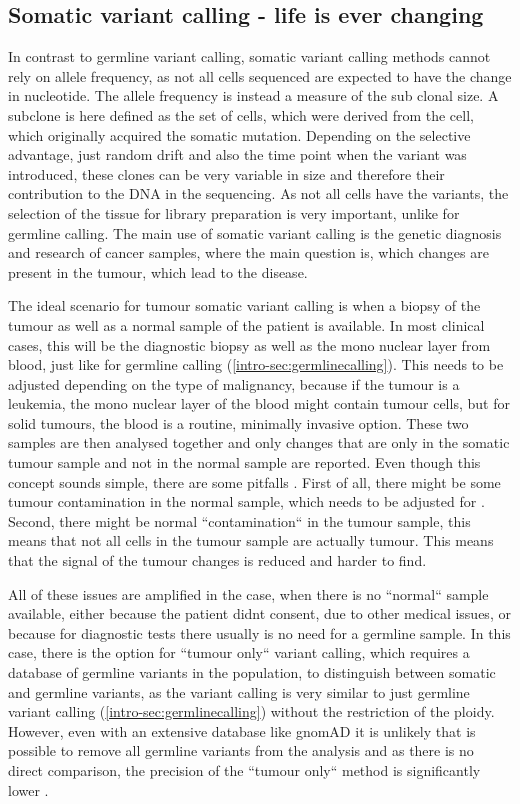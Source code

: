 \subsection[Somatic]{Somatic variant calling - life is ever changing}
\label{intro-sec:somaticcalling}
In contrast to germline variant calling, somatic variant calling methods cannot rely on allele frequency, as not all cells sequenced are expected to have the change in nucleotide. The allele frequency is instead a measure of the sub clonal size. A subclone is here defined as the set of cells, which were derived from the cell, which originally acquired the somatic mutation. Depending on the selective advantage, just random drift and also the time point when the variant was introduced, these clones can be very variable in size and therefore their contribution to the DNA in the sequencing.
As not all cells have the variants, the selection of the tissue for library preparation is very important, unlike for germline calling. 
The main use of somatic variant calling is the genetic diagnosis and research of cancer samples, where the main question is, which changes are present in the tumour, which lead to the disease.

The ideal scenario for tumour somatic variant calling is when a biopsy of the tumour as well as a normal sample of the patient is available. In most clinical cases, this will be the diagnostic biopsy as well as the mono nuclear layer from blood, just like for germline calling (\autoref{intro-sec:germlinecalling}). This needs to be adjusted depending on the type of malignancy, because if the tumour is a leukemia, the mono nuclear layer of the blood might contain tumour cells, but for solid tumours, the blood is a routine, minimally invasive option.
These two samples are then analysed together and only changes that are only in the somatic tumour sample and not in the normal sample are reported. Even though this concept sounds simple, there are some pitfalls \cite{GATKTeam2021a}. First of all, there might be some tumour contamination in the normal sample, which needs to be adjusted for \cite{Kim2018,TaylorWeiner2018}. Second, there might be normal ``contamination`` in the tumour sample, this means that not all cells in the tumour sample are actually tumour. This means that the signal of the tumour changes is reduced and harder to find.

All of these issues are amplified in the case, when there is no ``normal`` sample available, either because the patient didnt consent, due to other medical issues, or because for diagnostic tests there usually is no need for a germline sample. In this case, there is the option for ``tumour only`` variant calling, which requires a database of germline variants in the population, to distinguish between somatic and germline variants, as the variant calling is very similar to just germline variant calling (\autoref{intro-sec:germlinecalling}) without the restriction of the ploidy. However, even with an extensive database like gnomAD \cite{Karczewski2020} it is unlikely that is possible to remove all germline variants from the analysis and as there is no direct comparison, the precision of the ``tumour only`` method is significantly lower \cite{Karimnezhad2020}.
